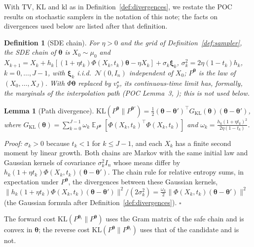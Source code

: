 \documentclass{article}
\DeclareMathOperator{\E}{\mathbb{E}}
\newcommand{\cN}{\mathcal{N}}
\newcommand{\bth}{\boldsymbol{\theta}}
\newcommand{\bxi}{\boldsymbol{\xi}}
\newcommand{\TV}{\mathrm{TV}}
\newcommand{\KL}{\mathrm{KL}}
\newcommand{\kl}{\mathrm{kl}}
\newcommand{\vstar}{v^{\star}}
\theoremstyle{plain}
\newtheorem{lemma}[theorem]{Lemma}
\newtheorem{definition}[theorem]{Definition}
\theoremstyle{remark}
\begin{document}
With $\TV$, $\KL$ and $\kl$ as in Definition~\ref{def:divergences}, we restate the POC results on stochastic samplers in the
notation of this note; the facts on divergences used below are listed after that definition.

\begin{definition}[SDE chain]\label{def:sde}
For $\eta>0$ and the grid of Definition~\ref{def:sampler}, the SDE chain of $\bth$ is $X_0\sim\mu_0$ and
$X_{k+1}=X_k+h_k[(1+\eta t_k)\Phi(X_k,t_k)\bth-\eta X_k]+\sigma_k\bxi_k$, $\sigma_k^2=2\eta(1-t_k)h_k$, $k=0,\dots,J-1$, with
$\bxi_k$ i.i.d.\ $\cN(0,I_n)$ independent of $X_0$; $P^{\bth}$ is the law of $(X_0,\dots,X_J)$. With $\Phi\bth$ replaced by $\vstar_p$, its
continuous-time limit has, formally, the marginals of the interpolation path (POC Lemma~3,
\citealt{albergo2025stochastic}); this is not used below.
\end{definition}

\begin{lemma}[Path divergence]\label{lem:chain_kl}
$\KL(P^{\bth}\|P^{\bth'})=\frac12(\bth-\bth')^\top G_{\KL}(\bth)(\bth-\bth')$, where
$G_{\KL}(\bth)=\sum_{k=0}^{J-1}\omega_k\E_{P^{\bth}}[\Phi(X_k,t_k)^\top\Phi(X_k,t_k)]$ and $\omega_k=\frac{h_k(1+\eta t_k)^2}{2\eta(1-t_k)}$.
\end{lemma}
\textit{Proof:}
$\sigma_k>0$ because $t_k<1$ for $k\le J-1$, and each $X_k$ has a finite second moment by linear growth.
Both chains are Markov with the same initial law and Gaussian kernels of covariance $\sigma_k^2I_n$
whose means differ by $h_k(1+\eta t_k)\Phi(X_k,t_k)(\bth-\bth')$. The chain rule for relative entropy
\citep[Thm.~2.5.3]{cover2006elements} sums, in expectation under $P^{\bth}$, the divergences between these Gaussian kernels,
$\|h_k(1+\eta t_k)\Phi(X_k,t_k)(\bth-\bth')\|^2/(2\sigma_k^2)=\frac{\omega_k}{2}\|\Phi(X_k,t_k)(\bth-\bth')\|^2$ (the Gaussian formula after
Definition~\ref{def:divergences}).
\hfill$\square$

The forward cost $\KL(P^{\bth_i}\|P^{\bth})$ uses the Gram matrix of the safe chain and is convex in $\bth$; the
reverse cost $\KL(P^{\bth}\|P^{\bth_i})$ uses that of the candidate and is not.
\end{document}
